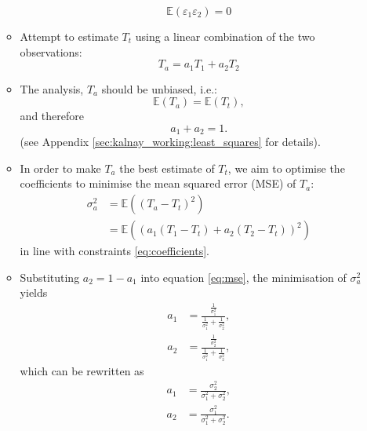 \begin{itemize}
\begin{itemize}
        \begin{equation}
            \mathbb{E}(\varepsilon_1 \varepsilon_2) = 0
        \end{equation}
        \item Attempt to estimate $T_t$ using a linear combination of the two observations:
        \begin{equation}
            T_a = a_1 T_1 + a_2 T_2
        \end{equation}
        \item The analysis, $T_a$ should be unbiased, i.e.:
        \begin{equation}
            \mathbb{E}(T_a) = \mathbb{E}(T_t),
        \end{equation}
        and therefore
        \begin{equation}
            a_1 + a_2 = 1. \label{eq:coefficients}
        \end{equation}
        (see Appendix \ref{sec:kalnay_working:least_squares} for details).
        \item In order to make $T_a$ the best estimate of $T_t$, we aim to optimise the coefficients to minimise the mean squared error (MSE) of $T_a$:
        \begin{align}
            \sigma_a^2 &= \mathbb{E} \left( \left( T_a - T_t \right)^2 \right) \nonumber \\
                        &= \mathbb{E} \left( \left( a_1(T_1 - T_t) + a_2(T_2 - T_t) \right)^2 \right) \label{eq:mse}
        \end{align}
        in line with constraints \ref{eq:coefficients}.
        \item Substituting $a_2 = 1 - a_1$ into equation \ref{eq:mse}, the minimisation of $\sigma_a^2$ yields
        \begin{subequations}
            \begin{align}
            a_1 &= \frac{\frac{1}{\sigma_1^2}}{\frac{1}{\sigma_1^2} + \frac{1}{\sigma_2^2}}, \\
            a_2 &= \frac{\frac{1}{\sigma_2^2}}{\frac{1}{\sigma_1^2} + \frac{1}{\sigma_2^2}},
            \end{align}
        \end{subequations}
        which can be rewritten as
        \begin{subequations}
            \begin{align}
            a_1 &= \frac{\sigma_2^2}{\sigma_1^2 + \sigma_2^2}, \\
            a_2 &= \frac{\sigma_1^2}{\sigma_1^2 + \sigma_2^2}.
            \end{align}
        \end{subequations}        
    \end{itemize}
\end{itemize}

